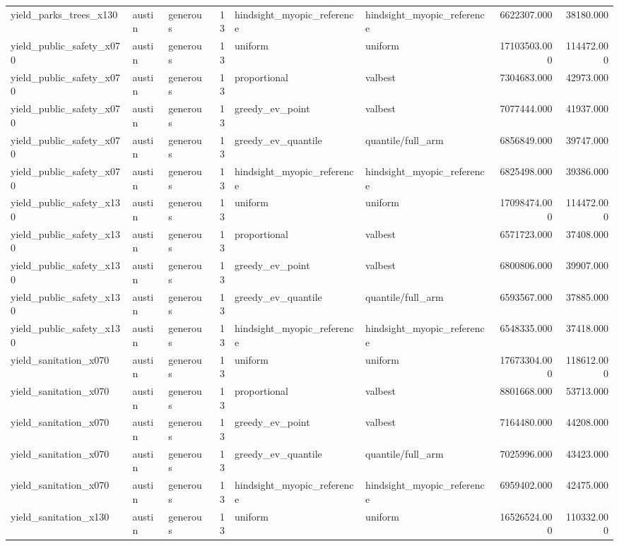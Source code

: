 \begin{tabular}{lllrllrr}
yield\_parks\_trees\_x130 & austin & generous & 13 & hindsight\_myopic\_reference & hindsight\_myopic\_reference & 6622307.000 & 38180.000 \\
yield\_public\_safety\_x070 & austin & generous & 13 & uniform & uniform & 17103503.000 & 114472.000 \\
yield\_public\_safety\_x070 & austin & generous & 13 & proportional & valbest & 7304683.000 & 42973.000 \\
yield\_public\_safety\_x070 & austin & generous & 13 & greedy\_ev\_point & valbest & 7077444.000 & 41937.000 \\
yield\_public\_safety\_x070 & austin & generous & 13 & greedy\_ev\_quantile & quantile/full\_arm & 6856849.000 & 39747.000 \\
yield\_public\_safety\_x070 & austin & generous & 13 & hindsight\_myopic\_reference & hindsight\_myopic\_reference & 6825498.000 & 39386.000 \\
yield\_public\_safety\_x130 & austin & generous & 13 & uniform & uniform & 17098474.000 & 114472.000 \\
yield\_public\_safety\_x130 & austin & generous & 13 & proportional & valbest & 6571723.000 & 37408.000 \\
yield\_public\_safety\_x130 & austin & generous & 13 & greedy\_ev\_point & valbest & 6800806.000 & 39907.000 \\
yield\_public\_safety\_x130 & austin & generous & 13 & greedy\_ev\_quantile & quantile/full\_arm & 6593567.000 & 37885.000 \\
yield\_public\_safety\_x130 & austin & generous & 13 & hindsight\_myopic\_reference & hindsight\_myopic\_reference & 6548335.000 & 37418.000 \\
yield\_sanitation\_x070 & austin & generous & 13 & uniform & uniform & 17673304.000 & 118612.000 \\
yield\_sanitation\_x070 & austin & generous & 13 & proportional & valbest & 8801668.000 & 53713.000 \\
yield\_sanitation\_x070 & austin & generous & 13 & greedy\_ev\_point & valbest & 7164480.000 & 44208.000 \\
yield\_sanitation\_x070 & austin & generous & 13 & greedy\_ev\_quantile & quantile/full\_arm & 7025996.000 & 43423.000 \\
yield\_sanitation\_x070 & austin & generous & 13 & hindsight\_myopic\_reference & hindsight\_myopic\_reference & 6959402.000 & 42475.000 \\
yield\_sanitation\_x130 & austin & generous & 13 & uniform & uniform & 16526524.000 & 110332.000 \\

\end{tabular}
